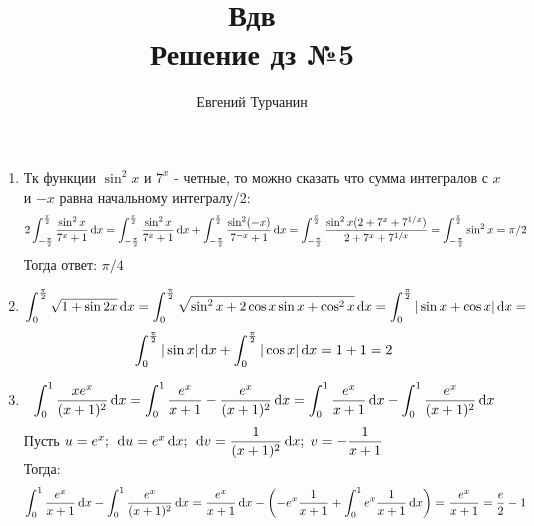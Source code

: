 \documentclass{report}
\title{\Huge{Вдв}\\ Решение дз №5}
\author{\huge{Евгений Турчанин}}
\date{}
\begin{document}
\maketitle
{}


\sol
\begin{enumerate}
\item
Тк функции $\sin^2 x$ и $7^x$ - четные, то можно сказать что сумма интегралов с $x$ и $-x$ равна начальному интегралу/2:
\begin{equation*}
	2\int_{-\frac{\pi}{2}}^{\frac{\pi}{2}} \dfrac{\sin^2 x}{7^x+1} \dl x= \int_{-\frac{\pi}{2}}^{\frac{\pi}{2}} \dfrac{\sin^2 x}{7^x+1} \dl x+\int_{-\frac{\pi}{2}}^{\frac{\pi}{2}} \dfrac{\sin^2 (-x)}{7^{-x}+1} \dl x=\int_{-\frac{\pi}{2}}^{\frac{\pi}{2}} \dfrac{\sin^2 x(2+7^x+7^{1/x})}{2+7^x+7^{1/x}}=\int_{-\frac{\pi}{2}}^{\frac{\pi}{2}} \sin^2 x=\pi/2
\end{equation*}
Тогда ответ: $\pi/4$
\item
\begin{equation*}
	\int_{0}^{\frac{\pi}{2}} \sqrt{1+\sin 2x} \dl x=\int_{0}^{\frac{\pi}{2}} \sqrt{\sin^2 x+2\cos x\sin x+\cos^2 x} \dl x=\int_{0}^{\frac{\pi}{2}} |\sin x+\cos x| \dl x=
\end{equation*}
\begin{equation*}
	\int_{0}^{\frac{\pi}{2}} |\sin x| \dl x+\int_{0}^{\frac{\pi}{2}} |\cos x| \dl x=1+1=2
\end{equation*}

\item
\begin{equation*}
	\int_{0}^{1} \dfrac{x e^x}{(x+1)^2} \dl x=\int_{0}^{1} \dfrac{e^x}{x+1}-\dfrac{e^x}{(x+1)^2} \dl x=\int_{0}^{1} \dfrac{e^x}{x+1}\dl x-\int_{0}^{1}\dfrac{e^x}{(x+1)^2} \dl x
\end{equation*}
Пусть $u=e^x;\; \dl u=e^x\dl x ;\; \dl v=\dfrac{1}{(x+1)^2} \dl x; \; v=-\dfrac{1}{x+1}$\\
Тогда:
\begin{equation*}
	\int_{0}^{1} \dfrac{e^x}{x+1}\dl x-\int_{0}^{1}\dfrac{e^x}{(x+1)^2} \dl x=\dfrac{e^x}{x+1}\dl x-\left(-e^x\dfrac{1}{x+1}+\int_{0}^{1} e^x\dfrac{1}{x+1} \dl x\right)=\dfrac{e^x}{x+1}=\dfrac{e}{2}-1
\end{equation*}


\end{enumerate}
\end{document}
